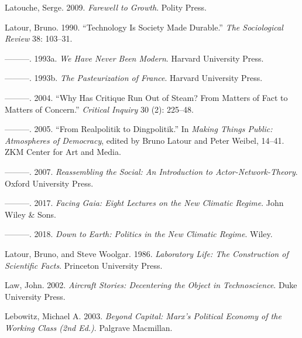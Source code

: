 \documentclass[a4paper, nobind]{templates/ociamthesis}
\newlength{\cslhangindent}
\newenvironment{CSLReferences}[2] %
 {%
  \setlength{\parindent}{0pt}
  \ifodd #1
  \let\oldpar\par
  \def\par{\hangindent=\cslhangindent\oldpar}
  \fi
  \setlength{\parskip}{1mm}
  \setlength{\baselineskip}{6mm}
 }%
 {}
\begin{document}
\begin{CSLReferences}{1}{0}
\leavevmode{}%
Latouche, Serge. 2009. \emph{Farewell to {Growth}}. {Polity Press}.

\leavevmode{}%
Latour, Bruno. 1990. {``Technology Is Society Made Durable.''} \emph{The Sociological Review} 38: 103--31.

\leavevmode{}%
---------. 1993a. \emph{We {Have Never Been Modern}}. {Harvard University Press}.

\leavevmode{}%
---------. 1993b. \emph{The {Pasteurization} of {France}}. {Harvard University Press}.

\leavevmode{}%
---------. 2004. {``Why {Has Critique Run} Out of {Steam}? {From Matters} of {Fact} to {Matters} of {Concern}.''} \emph{Critical Inquiry} 30 (2): 225--48.

\leavevmode{}%
---------. 2005. {``From Realpolitik to Dingpolitik.''} In \emph{Making Things Public: {Atmospheres} of Democracy}, edited by Bruno Latour and Peter Weibel, 14--41. {ZKM Center for Art and Media}.

\leavevmode{}%
---------. 2007. \emph{Reassembling the {Social}: {An Introduction} to {Actor-Network-Theory}}. {Oxford University Press}.

\leavevmode{}%
---------. 2017. \emph{Facing {Gaia}: {Eight Lectures} on the {New Climatic Regime}}. {John Wiley \& Sons}.

\leavevmode{}%
---------. 2018. \emph{Down to {Earth}: {Politics} in the {New Climatic Regime}}. {Wiley}.

\leavevmode{}%
Latour, Bruno, and Steve Woolgar. 1986. \emph{Laboratory {Life}: {The Construction} of {Scientific Facts}}. {Princeton University Press}.

\leavevmode{}%
Law, John. 2002. \emph{Aircraft {Stories}: {Decentering} the {Object} in {Technoscience}}. {Duke University Press}.

\leavevmode{}%
Lebowitz, Michael A. 2003. \emph{Beyond {Capital}: {Marx}'s {Political Economy} of the {Working Class} (2nd Ed.)}. {Palgrave Macmillan}.


\end{CSLReferences}
\end{document}
